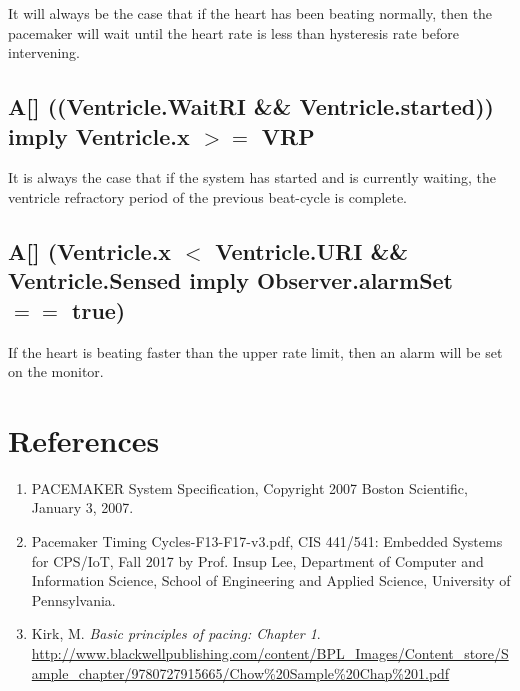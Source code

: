 \documentclass[10pt]{article}
\begin{document}
It will always be the case that if the heart has been beating normally, then the pacemaker will wait until the heart rate is less than hysteresis rate before intervening.

	\subsection{A[] ((Ventricle.WaitRI \&\& Ventricle.started)) imply Ventricle.x $>=$ VRP}

	It is always the case that if the system has started and is currently waiting, the ventricle refractory period of the previous beat-cycle is complete.

	\subsection{A[] (Ventricle.x $<$ Ventricle.URI \&\& Ventricle.Sensed imply Observer.alarmSet $==$ true)}

	If the heart is beating faster than the upper rate limit, then an alarm will be set on the monitor. 

\section{References}

	\begin{enumerate}
		\item PACEMAKER System Specification, Copyright 2007 Boston Scientific, January 3, 2007.
		\item Pacemaker Timing Cycles-F13-F17-v3.pdf, CIS 441/541: Embedded Systems for CPS/IoT, Fall 2017 by Prof. Insup Lee, Department of Computer and Information Science, School of Engineering and Applied Science, University of Pennsylvania.
		\item Kirk, M. \textit{Basic principles of pacing: Chapter 1}. \url{http://www.blackwellpublishing.com/content/BPL\_Images/Content\_store/Sample\_chapter/9780727915665/Chow%20Sample%20Chap%201.pdf}
	\end{enumerate}


	
\end{document}
